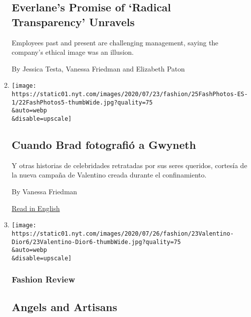 \begin{enumerate}
  \hypertarget{everlanes-promise-of-radical-transparency-unravels}{%
  \subsection{Everlane's Promise of `Radical Transparency'
  Unravels}\label{everlanes-promise-of-radical-transparency-unravels}}

  Employees past and present are challenging management, saying the
  company's ethical image was an illusion.

  By Jessica Testa, Vanessa Friedman and Elizabeth Paton
\item
  \href{/es/2020/07/25/espanol/estilos-de-vida/gwyneth-paltrow-valentino.html}{}

  \texttt{[image: https://static01.nyt.com/images/2020/07/23/fashion/25FashPhotos-ES-1/22FashPhotos5-thumbWide.jpg?quality=75\\\&auto=webp\\\&disable=upscale]}

  \hypertarget{cuando-brad-fotografiuxf3-a-gwyneth}{%
  \subsection{Cuando Brad fotografió a
  Gwyneth}\label{cuando-brad-fotografiuxf3-a-gwyneth}}

  Y otras historias de celebridades retratadas por sus seres queridos,
  cortesía de la nueva campaña de Valentino creada durante el
  confinamiento.

  By Vanessa Friedman

  \href{https://www.nytimes.com/2020/07/22/style/gwyneth-paltrow-valentino-ad-campaign.html}{Read
  in English}
\item
  \href{/2020/07/23/style/valentino-dior-fashion-shows.html}{}

  \texttt{[image: https://static01.nyt.com/images/2020/07/26/fashion/23Valentino-Dior6/23Valentino-Dior6-thumbWide.jpg?quality=75\\\&auto=webp\\\&disable=upscale]}

  \hypertarget{fashion-review}{%
  \subsubsection{Fashion Review}\label{fashion-review}}

  \hypertarget{angels-and-artisans}{%
  \subsection{Angels and Artisans}\label{angels-and-artisans}}


\end{enumerate}
